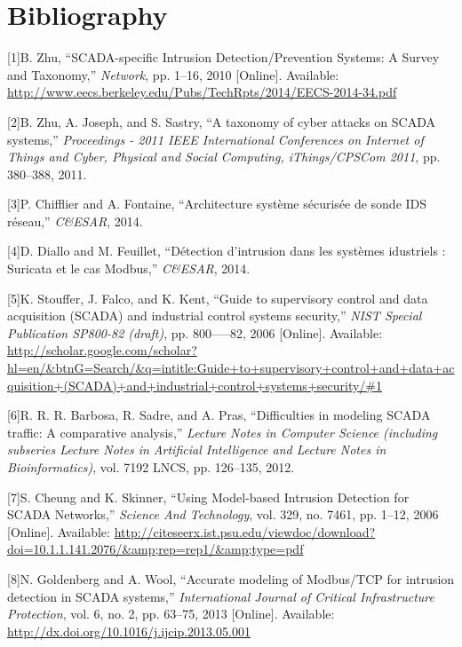 \documentclass[11pt,]{article}
\begin{document}
\newpage

\section*{Bibliography}\label{bibliography}

{[}1{]}B. Zhu, ``SCADA-specific Intrusion Detection/Prevention Systems:
A Survey and Taxonomy,'' \emph{Network}, pp. 1--16, 2010 {[}Online{]}.
Available:
\url{http://www.eecs.berkeley.edu/Pubs/TechRpts/2014/EECS-2014-34.pdf}

{[}2{]}B. Zhu, A. Joseph, and S. Sastry, ``A taxonomy of cyber attacks
on SCADA systems,'' \emph{Proceedings - 2011 IEEE International
Conferences on Internet of Things and Cyber, Physical and Social
Computing, iThings/CPSCom 2011}, pp. 380--388, 2011.

{[}3{]}P. Chifflier and A. Fontaine, ``Architecture système sécurisée de
sonde IDS réseau,'' \emph{C\&ESAR}, 2014.

{[}4{]}D. Diallo and M. Feuillet, ``Détection d'intrusion dans les
systèmes idustriels : Suricata et le cas Modbus,'' \emph{C\&ESAR}, 2014.

{[}5{]}K. Stouffer, J. Falco, and K. Kent, ``Guide to supervisory
control and data acquisition (SCADA) and industrial control systems
security,'' \emph{NIST Special Publication SP800-82 (draft)}, pp.
800-----82, 2006 {[}Online{]}. Available:
\url{http://scholar.google.com/scholar?hl=en/\&btnG=Search/\&q=intitle:Guide+to+supervisory+control+and+data+acquisition+(SCADA)+and+industrial+control+systems+security/\#1}

{[}6{]}R. R. R. Barbosa, R. Sadre, and A. Pras, ``Difficulties in
modeling SCADA traffic: A comparative analysis,'' \emph{Lecture Notes in
Computer Science (including subseries Lecture Notes in Artificial
Intelligence and Lecture Notes in Bioinformatics)}, vol. 7192 LNCS, pp.
126--135, 2012.

{[}7{]}S. Cheung and K. Skinner, ``Using Model-based Intrusion Detection
for SCADA Networks,'' \emph{Science And Technology}, vol. 329, no. 7461,
pp. 1--12, 2006 {[}Online{]}. Available:
\url{http://citeseerx.ist.psu.edu/viewdoc/download?doi=10.1.1.141.2076/\&amp;rep=rep1/\&amp;type=pdf}

{[}8{]}N. Goldenberg and A. Wool, ``Accurate modeling of Modbus/TCP for
intrusion detection in SCADA systems,'' \emph{International Journal of
Critical Infrastructure Protection}, vol. 6, no. 2, pp. 63--75, 2013
{[}Online{]}. Available:
\url{http://dx.doi.org/10.1016/j.ijcip.2013.05.001}
\end{document}
